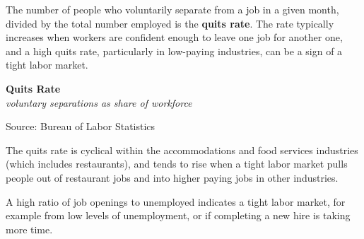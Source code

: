 \documentclass{report}
\makeatletter
\newcommand{\tbllink}[1]{\href{https://raw.githubusercontent.com/bdecon/US-chartbook/master/chartbook/data/#1}{\faTable}}
\newcommand*\short[1]{\expandafter\@gobbletwo\number\numexpr#1\relax}
\newcommand{\absnode}[3]{\node[below right, align=left] at (axis cs: #1,#2) {#3};}
\newcommand{\shdateaxisticks}{
		date coordinates in=x, axis line style={draw=none},
		xmax={2024-01-31},
		max space between ticks=40,	    
		xtick={{1990-01-01}, {1995-01-01}, {2000-01-01}, 
			{2005-01-01}, {2010-01-01}, {2015-01-01}, {2020-01-01}},
		minor xtick={},
		enlarge y limits={0.06}, enlarge x limits={0.01},
		xticklabel style={align=center, yshift=-2pt}, tick label style={inner sep=0pt},
		}
\newcommand{\bbar}[2]{extra #1 ticks = {{#2}}, extra #1 tick labels = ,
		extra #1 tick style = {grid=major, grid style={thick, black!25}},}
\newcommand{\stdline}[4]{\addplot[very thick, no markers, color=#1] 
		table [x=#2, y=#3, col sep=comma] {#4};	}
\newcommand{\thinline}[4]{\addplot[no markers, color=#1] 
		table [x=#2, y=#3, col sep=comma] {#4};	}
\newcommand{\rebars}{
		\fill[color=black!10] (axis cs:{2007-12-01},\pgfkeysvalueof{/pgfplots/ymin}) 
			rectangle (axis cs:{2009-07-01}, \pgfkeysvalueof{/pgfplots/ymax});
		\fill[color=black!10] (axis cs:{2001-03-01},\pgfkeysvalueof{/pgfplots/ymin}) 
			rectangle (axis cs:{2001-11-01}, \pgfkeysvalueof{/pgfplots/ymax});
		\fill[color=black!10] (axis cs:{2020-02-01},\pgfkeysvalueof{/pgfplots/ymin}) 
			rectangle (axis cs:{2020-05-01}, \pgfkeysvalueof{/pgfplots/ymax});}
\makeatother
\begin{document}
{\begin{minipage}{1.0\textwidth}
\small The number of people who voluntarily separate from a job in a given month, divided by the total number employed is the \textbf{quits rate}. The rate typically increases when workers are confident enough to leave one job for another one, and a high quits rate, particularly in low-paying industries, can be a sign of a tight labor market.
\end{minipage}
\vspace{1mm}

\begin{minipage}{0.4\textwidth}
\normalsize \textbf{Quits Rate}\\
\footnotesize{\textit{voluntary separations as share of workforce}}
\vspace{3.6cm}

\hspace{1mm} 

\footnotesize{Source: Bureau of Labor Statistics} \hfill \tbllink{quits.csv}
\end{minipage}
\hspace{6mm}
\begin{minipage}{0.31\textwidth}
\small The quits rate is cyclical within the accommodations and food services industries (which includes restaurants), and tends to rise when a tight labor market pulls people out of restaurant jobs and into higher paying jobs in other industries. 


\end{minipage}
\newpage
\begin{minipage}{1.0\textwidth}   
\small A high ratio of job openings to unemployed indicates a tight labor market, for example from low levels of unemployment, or if completing a new hire is taking more time. 
\vspace{1mm}


\end{minipage}}
\end{document}

